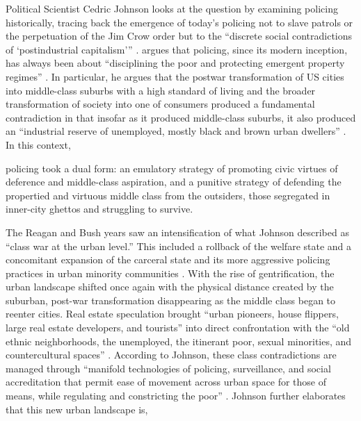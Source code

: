 \documentclass[12pt]{article}
\renewenvironment{quote}
  {\list{}{\leftmargin=\parindent\rightmargin=0pt}%
   \item\relax}
  {\endlist}
\begin{document}
Political Scientist Cedric Johnson looks at the question by examining policing historically, tracing back the emergence of today’s policing not to slave patrols or the perpetuation of the Jim Crow order but to the “discrete social contradictions of ‘postindustrial capitalism’” \parencite*[171]{johnsonTrumpismPolicingProblem2019}. \citeauthor{johnsonTrumpismPolicingProblem2019} argues that policing, since its modern inception, has always been about “disciplining the poor and protecting emergent property regimes” \parencite*[172]{johnsonTrumpismPolicingProblem2019}. In particular, he argues that the postwar transformation of US cities into middle-class suburbs with a high standard of living and the broader transformation of society into one of consumers produced a fundamental contradiction in that insofar as it produced middle-class suburbs, it also produced an “industrial reserve of unemployed, mostly black and brown urban dwellers” \parencite*[171]{johnsonTrumpismPolicingProblem2019}. In this context,

\begin{quote}
policing took a dual form: an emulatory strategy of promoting civic virtues of deference and middle-class aspiration, and a punitive strategy of defending the propertied and virtuous middle class from the outsiders, those segregated in inner-city ghettos and struggling to survive. \parencite[176]{johnsonTrumpismPolicingProblem2019}
\end{quote}

The Reagan and Bush years saw an intensification of what Johnson described as “class war at the urban level.” This included a rollback of the welfare state and a concomitant expansion of the carceral state and its more aggressive policing practices in urban minority communities \parencites[177]{johnsonTrumpismPolicingProblem2019}{johnsonBlackLivesMatter2023}. With the rise of gentrification, the urban landscape shifted once again with the physical distance created by the suburban, post-war transformation disappearing as the middle class began to reenter cities. Real estate speculation brought “urban pioneers, house flippers, large real estate developers, and tourists” into direct confrontation with the “old ethnic neighborhoods, the unemployed, the itinerant poor, sexual minorities, and countercultural spaces” \parencite[177]{johnsonTrumpismPolicingProblem2019}. According to Johnson, these class contradictions are managed through “manifold technologies of policing, surveillance, and social accreditation that permit ease of movement across urban space for those of means, while regulating and constricting the poor” \parencite*[178]{johnsonTrumpismPolicingProblem2019}. Johnson further elaborates that this new urban landscape is,
\end{document}
